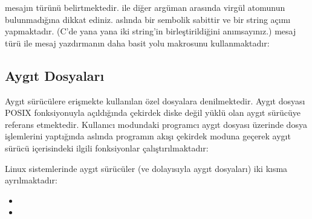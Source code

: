 \documentclass[a4paper,10pt,turkish]{sphinxmanual}
\begin{document}
\begin{sphinxVerbatim}[commandchars=\\\{\}]
\end{sphinxVerbatim}

\sphinxAtStartPar
{} mesajın türünü belirtmektedir.  ile diğer argüman arasında virgül atomunun
bulunmadığına dikkat ediniz.  aslında bir sembolik sabittir ve bir string açımı
yapmaktadır. (C’de yana yana iki string’in birleştirildiğini anımsayınız.)  mesaj türü ile
mesaj yazdırmanın daha basit yolu  makrosunu kullanmaktadır:

\begin{sphinxVerbatim}[commandchars=\\\{\}]
\end{sphinxVerbatim}


\subsection{Aygıt Dosyaları}
\label{\detokenize{processcontrolblock:aygit-dosyalari}}
\sphinxAtStartPar
Aygıt sürücülere erişmekte kullanılan özel dosyalara  denilmektedir.
Aygıt dosyası  POSIX fonksiyonuyla açıldığında çekirdek diske değil yüklü olan aygıt sürücüye
referans etmektedir. Kullanıcı modundaki programcı aygıt dosyası üzerinde dosya işlemlerini yaptığında
aslında programın akışı çekirdek moduna geçerek aygıt sürücü içerisindeki ilgili fonksiyonlar
çalıştırılmaktadır:


\sphinxAtStartPar
Linux sistemlerinde aygıt sürücüler (ve dolayısıyla aygıt dosyaları) iki kısma ayrılmaktadır:
\begin{itemize}
\item {} 
\sphinxAtStartPar
{}

\item {} 
\sphinxAtStartPar
{}

\end{itemize}
\end{document}
